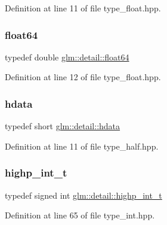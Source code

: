 Definition at line 11 of file type\+\_\+float.\+hpp.

\mbox{\label{namespaceglm_1_1detail_a5a0a9a1be3fd5dbe6d47ae45c3022b06}} 
\subsubsection{\texorpdfstring{float64}{float64}}
{\footnotesize\ttfamily typedef double \mbox{\hyperlink{namespaceglm_1_1detail_a5a0a9a1be3fd5dbe6d47ae45c3022b06}{glm\+::detail\+::float64}}}



Definition at line 12 of file type\+\_\+float.\+hpp.

\mbox{\label{namespaceglm_1_1detail_aa2115f7dd38e14fea7ba9e95104120f3}} 
\subsubsection{\texorpdfstring{hdata}{hdata}}
{\footnotesize\ttfamily typedef short \mbox{\hyperlink{namespaceglm_1_1detail_aa2115f7dd38e14fea7ba9e95104120f3}{glm\+::detail\+::hdata}}}



Definition at line 11 of file type\+\_\+half.\+hpp.

\mbox{\label{namespaceglm_1_1detail_a74c48e9deafcc33db998a4ee62da8d6e}} 
\subsubsection{\texorpdfstring{highp\_int\_t}{highp\_int\_t}}
{\footnotesize\ttfamily typedef signed int \mbox{\hyperlink{namespaceglm_1_1detail_a74c48e9deafcc33db998a4ee62da8d6e}{glm\+::detail\+::highp\+\_\+int\+\_\+t}}}



Definition at line 65 of file type\+\_\+int.\+hpp.

\mbox{\label{namespaceglm_1_1detail_a994c05c8a976cc902a7cd193ad36bbba}} 
